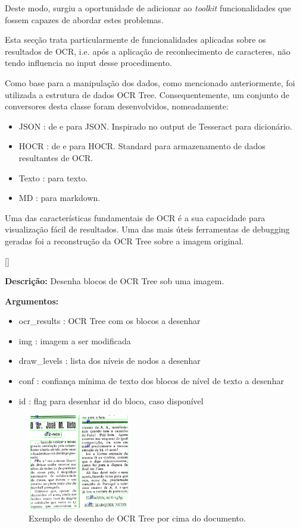 Deste modo, surgiu a oportunidade de adicionar ao \textit{toolkit} funcionalidades que fossem capazes de abordar estes problemas.

Esta secção trata particularmente de funcionalidades aplicadas sobre os resultados de OCR, i.e. após a aplicação de reconhecimento de caracteres, não tendo influencia no input desse procedimento.


\label{ocr_results_conversion}

Como base para a manipulação dos dados, como mencionado anteriormente, foi utilizada a estrutura de dados OCR Tree. Consequentemente, um conjunto de conversores desta classe foram desenvolvidos, nomeadamente:

\begin{itemize}
	\item JSON : de e para JSON. Inspirado no output de Tesseract para dicionário.
	\item HOCR : de e para HOCR. Standard para armazenamento de dados resultantes de OCR.
	\item Texto : para texto.
	\item MD : para markdown.
\end{itemize}


\label{contribution_debugging}

Uma das características fundamentais de OCR é a sua capacidade para visualização fácil de resultados. Uma das mais úteis ferramentas de debugging geradas foi a reconstrução da OCR Tree sobre a imagem original.

[\normalsize]

\textbf{Descrição:} Desenha blocos de OCR Tree sob uma imagem.

\textbf{Argumentos:}
\begin{itemize}\setlength\itemsep{-0.3em}
	\item ocr\_results : OCR Tree com os blocos a desenhar
	\item img : imagem a ser modificada
	\item draw\_levels : lista dos níveis de nodos a desenhar
	\item conf : confiança mínima de texto dos blocos de nível de texto a desenhar
	\item id : flag para desenhar id do bloco, caso disponível
\end{itemize}

\begin{figure}[H]
	 	\centering
	 	\includegraphics[width=0.4\textwidth]{images/ilustracoes/drawn_blocks.png}
	 	\caption{Exemplo de desenho de OCR Tree por cima do documento.}
	 	\label{fig:draw_ocr_results}
\end{figure}

